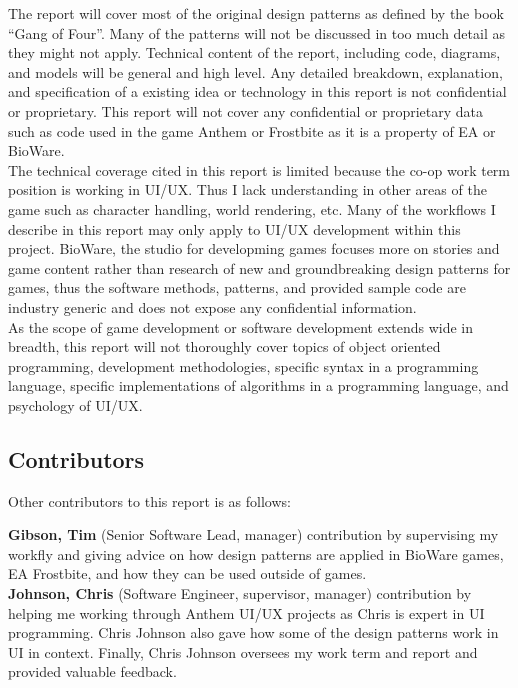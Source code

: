 The report will cover most of the original design patterns as defined by the book ``Gang of Four''\cite{gof}. Many of the patterns will not be discussed in too much detail as they might not apply. Technical content of the report, including code, diagrams, and models will be general and high level. Any detailed breakdown, explanation, and specification of a existing idea or technology in this report is not confidential or proprietary. This report will not cover any confidential or proprietary data such as code used in the game Anthem or Frostbite as it is a property of EA or BioWare.\bs
\\
The technical coverage cited in this report is limited because the co-op work term position is working in UI/UX. Thus I lack understanding in other areas of the game such as character handling, world rendering, etc. Many of the workflows I describe in this report may only apply to UI/UX development within this project. BioWare, the studio for developming games focuses more on stories and game content rather than research of new and groundbreaking design patterns for games, thus the software methods, patterns, and provided sample code are industry generic and does not expose any confidential information.\bs
\\
As the scope of game development or software development extends wide in breadth, this report will not thoroughly cover topics of object oriented programming, development methodologies, specific syntax in a programming language, specific implementations of algorithms in a programming language, and psychology of UI/UX. 

\subsection*{Contributors}

Other contributors to this report is as follows:

\textbf{Gibson, Tim} (Senior Software Lead, manager) contribution by supervising my workfly and giving advice on how design patterns are applied in BioWare games, EA Frostbite, and how they can be used outside of games.\\
\textbf{Johnson, Chris} (Software Engineer, supervisor, manager) contribution by helping me working through Anthem UI/UX projects as Chris is expert in UI programming. Chris Johnson also gave how some of the design patterns work in UI in context. Finally, Chris Johnson oversees my work term and report and provided valuable feedback.

\newpage